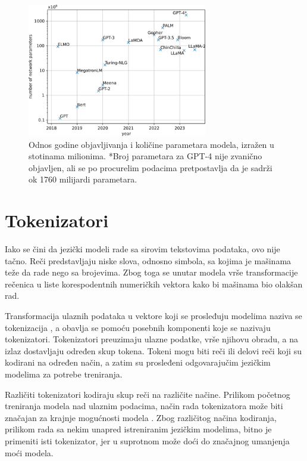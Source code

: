 \documentclass[12pt,oneside]{memoir}
\begin{document}
\begin{figure}[!ht]
	\centering
	\label{fig:LLMParametersTimelapse}
	\includegraphics[width=0.7\textwidth]{LLMParametersTimelapse.png}
	\caption{Odnos godine objavljivanja i količine parametara modela, izražen u stotinama milionima. *Broj parametara za GPT-4 nije zvanično objavljen, ali se po procurelim podacima pretpostavlja da je sadrži ok 1760 milijardi parametara.}
\end{figure}

\section{Tokenizatori}
Iako se čini da jezički modeli rade sa sirovim tekstovima podataka, ovo nije tačno. Reči predstavljaju niske slova, odnosno simbola, sa kojima je mašinama teže da rade nego sa brojevima. Zbog toga se unutar modela vrše transformacije rečenica u liste korespodentnih numeričkih vektora kako bi mašinama bio olakšan rad. 

Transformacija ulaznih podataka u vektore koji se prosleđuju modelima naziva se tokenizacija \cite{Tokenization}, a obavlja se pomoću posebnih komponenti koje se nazivaju tokenizatori. Tokenizatori preuzimaju ulazne podatke, vrše njihovu obradu, a na izlaz dostavljaju određen skup tokena. Tokeni mogu biti reči ili delovi reči koji su kodirani na određen način, a zatim su prosleđeni odgovarajučim jezičkim modelima za potrebe treniranja. 

Različiti tokenizatori kodiraju skup reči na različite načine. Prilikom početnog treniranja modela nad ulaznim podacima, način rada tokenizatora može biti značajan za krajnje mogućnosti modela \cite{Huggingface_tokenizers} \cite{Tokenizers}. Zbog različitog načina kodiranja, prilikom rada sa nekim unapred istreniranim jezičkim modelima, bitno je primeniti isti tokenizator, jer u suprotnom može doći do značajnog umanjenja moći modela.
\end{document}

